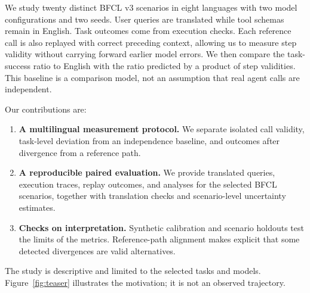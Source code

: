 \documentclass[11pt]{article}
\begin{document}
We study twenty distinct BFCL v3 scenarios in eight languages with two model
configurations and two seeds. User queries are translated while tool schemas
remain in English. Task outcomes come from execution checks. Each reference
call is also replayed with correct preceding context, allowing us to measure
step validity without carrying forward earlier model errors. We then compare
the task-success ratio to English with the ratio predicted by a product of
step validities. This baseline is a comparison model, not an assumption that
real agent calls are independent.

Our contributions are:
\begin{enumerate}
\itemsep0.15em
\item \textbf{A multilingual measurement protocol.} We separate isolated
call validity, task-level deviation from an independence baseline, and
outcomes after divergence from a reference path.
\item \textbf{A reproducible paired evaluation.} We provide translated
queries, execution traces, replay outcomes, and analyses for the selected
BFCL scenarios, together with translation checks and scenario-level
uncertainty estimates.
\item \textbf{Checks on interpretation.} Synthetic calibration and
scenario holdouts test the limits of the metrics. Reference-path alignment
makes explicit that some detected divergences are valid alternatives.
\end{enumerate}

The study is descriptive and limited to the selected tasks and models.
Figure~\ref{fig:teaser} illustrates the motivation; it is not an observed
trajectory.
\end{document}

